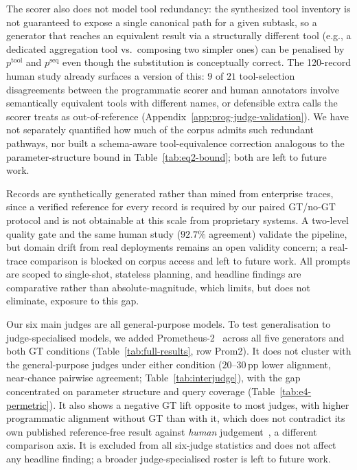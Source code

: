The scorer also does not model tool redundancy: the synthesized tool inventory is not guaranteed to expose a single canonical path for a given subtask, so a generator that reaches an equivalent result via a structurally different tool (e.g., a dedicated aggregation tool vs.\ composing two simpler ones) can be penalised by $p^{\text{tool}}$ and $p^{\text{seq}}$ even though the substitution is conceptually correct. The 120-record human study already surfaces a version of this: $9$ of $21$ tool-selection disagreements between the programmatic scorer and human annotators involve semantically equivalent tools with different names, or defensible extra calls the scorer treats as out-of-reference (Appendix~\ref{app:prog-judge-validation}). We have not separately quantified how much of the corpus admits such redundant pathways, nor built a schema-aware tool-equivalence correction analogous to the parameter-structure bound in Table~\ref{tab:eq2-bound}; both are left to future work.

Records are synthetically generated rather than mined from enterprise traces, since a verified reference for every record is required by our paired GT/no-GT protocol and is not obtainable at this scale from proprietary systems. A two-level quality gate and the same human study ($92.7\%$ agreement) validate the pipeline, but domain drift from real deployments remains an open validity concern; a real-trace comparison is blocked on corpus access and left to future work. All prompts are scoped to single-shot, stateless planning, and headline findings are comparative rather than absolute-magnitude, which limits, but does not eliminate, exposure to this gap.

Our six main judges are all general-purpose models. To test generalisation to judge-specialised models, we added Prometheus-2~\citep{kim2024prometheus2} across all five generators and both GT conditions (Table~\ref{tab:full-results}, row Prom2). It does not cluster with the general-purpose judges under either condition ($20$--$30$\,pp lower alignment, near-chance pairwise agreement; Table~\ref{tab:interjudge}), with the gap concentrated on parameter structure and query coverage (Table~\ref{tab:e4-permetric}). It also shows a negative GT lift opposite to most judges, with higher programmatic alignment without GT than with it, which does not contradict its own published reference-free result against \emph{human} judgement~\citep[Appendix F]{kim2024prometheus2}, a different comparison axis. It is excluded from all six-judge statistics and does not affect any headline finding; a broader judge-specialised roster is left to future work.

